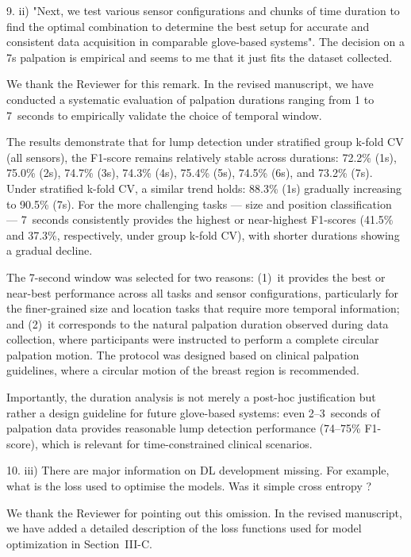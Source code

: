 \documentclass[a4paper, onecolumn]{IEEEtran}
\newcommand\blue[1]{{\textcolor{white!30!blue}{#1}}}
\begin{document}
\blue{9. ii) "Next, we test various sensor configurations and chunks of time duration to find the optimal combination to determine the best setup for accurate and consistent data acquisition in comparable glove-based systems". The decision on a 7s palpation is empirical and seems to me that it just fits the dataset collected.}

We thank the Reviewer for this remark. In the revised manuscript, we have conducted a systematic evaluation of palpation durations ranging from 1 to 7~seconds to empirically validate the choice of temporal window.

The results demonstrate that for lump detection under stratified group k-fold CV (all sensors), the F1-score remains relatively stable across durations: 72.2\% (1s), 75.0\% (2s), 74.7\% (3s), 74.3\% (4s), 75.4\% (5s), 74.5\% (6s), and 73.2\% (7s). Under stratified k-fold CV, a similar trend holds: 88.3\% (1s) gradually increasing to 90.5\% (7s). For the more challenging tasks --- size and position classification --- 7~seconds consistently provides the highest or near-highest F1-scores (41.5\% and 37.3\%, respectively, under group k-fold CV), with shorter durations showing a gradual decline.

The 7-second window was selected for two reasons: (1)~it provides the best or near-best performance across all tasks and sensor configurations, particularly for the finer-grained size and location tasks that require more temporal information; and (2)~it corresponds to the natural palpation duration observed during data collection, where participants were instructed to perform a complete circular palpation motion. The protocol was designed based on clinical palpation guidelines, where a circular motion of the breast region is recommended.

Importantly, the duration analysis is not merely a post-hoc justification but rather a design guideline for future glove-based systems: even 2--3~seconds of palpation data provides reasonable lump detection performance (74--75\% F1-score), which is relevant for time-constrained clinical scenarios.



\blue{10. iii) There are major information on DL development missing. For example, what is the loss used to optimise the models. Was it simple cross entropy ?}

We thank the Reviewer for pointing out this omission. In the revised manuscript, we have added a detailed description of the loss functions used for model optimization in Section~III-C.
\end{document}
